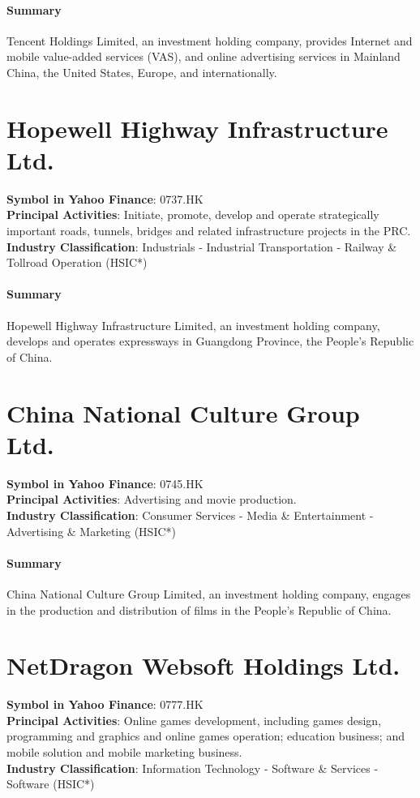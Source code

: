\paragraph{Summary}
Tencent Holdings Limited, an investment holding company, provides Internet and mobile value-added services (VAS), and online advertising services in Mainland China, the United States, Europe, and internationally.


\section{Hopewell Highway Infrastructure Ltd.}
\textbf{Symbol in Yahoo Finance}: 0737.HK\\
\textbf{Principal Activities}: Initiate, promote, develop and operate strategically important roads, tunnels, bridges and related infrastructure projects in the PRC.\\
\textbf{Industry Classification}: Industrials - Industrial Transportation - Railway \& Tollroad Operation (HSIC*)
\paragraph{Summary}
Hopewell Highway Infrastructure Limited, an investment holding company, develops and operates expressways in Guangdong Province, the People's Republic of China.


\section{China National Culture Group Ltd.}
\textbf{Symbol in Yahoo Finance}: 0745.HK\\
\textbf{Principal Activities}: Advertising and movie production.\\
\textbf{Industry Classification}: Consumer Services - Media \& Entertainment - Advertising \& Marketing (HSIC*)
\paragraph{Summary}
China National Culture Group Limited, an investment holding company, engages in the production and distribution of films in the People's Republic of China.


\section{NetDragon Websoft Holdings Ltd.}
\textbf{Symbol in Yahoo Finance}: 0777.HK\\
\textbf{Principal Activities}: Online games development, including games design, programming and graphics and online games operation; education business; and mobile solution and mobile marketing business.\\
\textbf{Industry Classification}: Information Technology - Software \& Services - Software (HSIC*)
